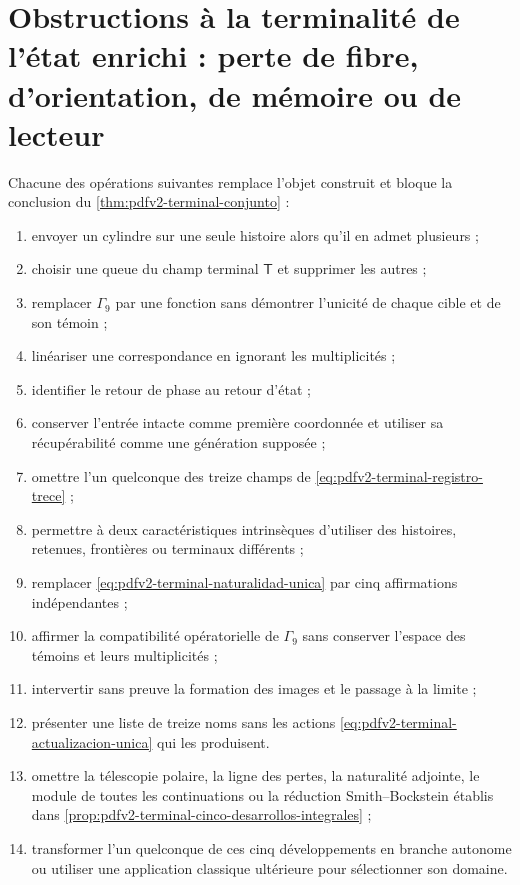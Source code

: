\section{Obstructions à la terminalité de l'état enrichi : perte de fibre, d'orientation, de mémoire ou de lecteur}

\begin{proposition}
\label{prop:pdfv2-terminal-falsadores}
Chacune des opérations suivantes remplace l'objet construit et bloque la conclusion du \cref{thm:pdfv2-terminal-conjunto} :
\begin{enumerate}
 \item envoyer un cylindre sur une seule histoire alors qu'il en admet plusieurs ;
 \item choisir une queue du champ terminal \(\mathsf T\) et supprimer les autres ;
 \item remplacer \(\Gamma_9\) par une fonction sans démontrer l'unicité de chaque cible et de son témoin ;
 \item linéariser une correspondance en ignorant les multiplicités ;
 \item identifier le retour de phase au retour d'état ;
 \item conserver l'entrée intacte comme première coordonnée et utiliser sa récupérabilité comme une génération supposée ;
 \item omettre l'un quelconque des treize champs de \eqref{eq:pdfv2-terminal-registro-trece} ;
 \item permettre à deux caractéristiques intrinsèques d'utiliser des histoires, retenues, frontières ou terminaux différents ;
 \item remplacer \eqref{eq:pdfv2-terminal-naturalidad-unica} par cinq affirmations indépendantes ;
 \item affirmer la compatibilité opératorielle de \(\Gamma_9\) sans conserver l'espace des témoins et leurs multiplicités ;
 \item intervertir sans preuve la formation des images et le passage à la limite ;
 \item présenter une liste de treize noms sans les actions \eqref{eq:pdfv2-terminal-actualizacion-unica} qui les produisent.
 \item omettre la télescopie polaire, la ligne des pertes, la naturalité adjointe, le module de toutes les continuations ou la réduction Smith--Bockstein établis dans \cref{prop:pdfv2-terminal-cinco-desarrollos-integrales} ;
 \item transformer l'un quelconque de ces cinq développements en branche autonome ou utiliser une application classique ultérieure pour sélectionner son domaine.
\end{enumerate}
\end{proposition}

